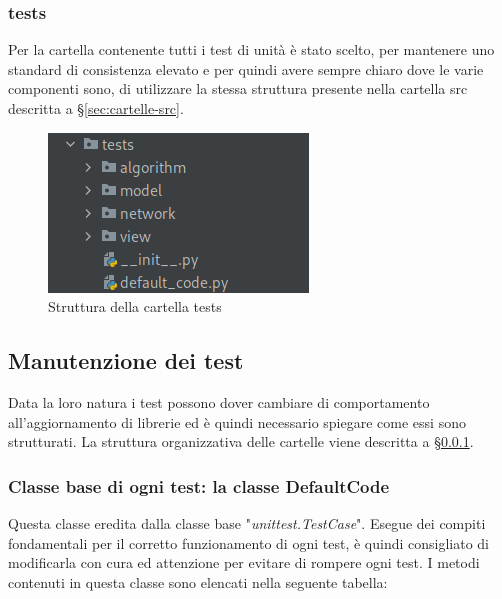 \subsubsection{tests} \label{sec:cartelle-tests}
Per la cartella contenente tutti i test di unità è stato scelto, per mantenere uno standard di consistenza elevato e per quindi avere sempre chiaro dove le varie componenti sono, di utilizzare la stessa struttura presente nella cartella src descritta a \S{}\ref{sec:cartelle-src}.
\begin{figure}[H]
    \centering
    \includegraphics[scale = 0.5]{components/img/struttura-cartella-tests.png}
    \caption{Struttura della cartella tests}
    \label{fig:Struttura della cartella tests}
\end{figure}

\subsection{Manutenzione dei test}
Data la loro natura i test possono dover cambiare di comportamento all'aggiornamento di librerie ed è quindi necessario spiegare come essi sono strutturati. La struttura organizzativa delle cartelle viene descritta a \S{}\ref{sec:cartelle-tests}.
\subsubsection{Classe base di ogni test: la classe DefaultCode}
Questa classe eredita dalla classe base "\textit{unittest.TestCase}". Esegue dei compiti fondamentali per il corretto funzionamento di ogni test, è quindi consigliato di modificarla con cura ed attenzione per evitare di rompere ogni test.
I metodi contenuti in questa classe sono elencati nella seguente tabella:
